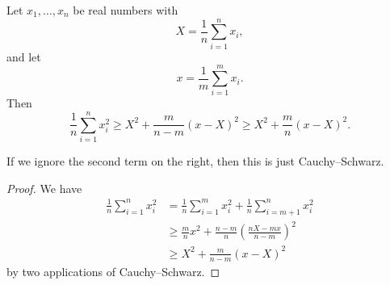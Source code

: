 \documentclass[a4paper]{article}
\begin{document}
\begin{lemma}
  Let $x_1, \ldots, x_n$ be real numbers with
  \[
    X = \frac{1}{n} \sum_{i = 1}^n x_i,
  \]
  and let
  \[
    x = \frac{1}{m} \sum_{i = 1}^m x_i.
  \]
  Then
  \[
    \frac{1}{n} \sum_{i = 1}^n x_i^2 \geq X^2 + \frac{m}{n - m}(x - X)^2 \geq X^2 + \frac{m}{n} (x - X)^2.
  \]
\end{lemma}
If we ignore the second term on the right, then this is just Cauchy--Schwarz.

\begin{proof}
  We have
  \begin{align*}
    \frac{1}{n} \sum_{i = 1}^n x_i^2 &= \frac{1}{n} \sum_{i = 1}^m x_i^2 + \frac{1}{n} \sum_{i = m + 1}^n x_i^2 \\
    &\geq \frac{m}{n} x^2 + \frac{n - m}{n} \left(\frac{nX - mx}{n - m}\right)^2\\
    &\geq X^2 + \frac{m}{n - m} (x - X)^2
  \end{align*}
  by two applications of Cauchy--Schwarz.
\end{proof}
\end{document}
